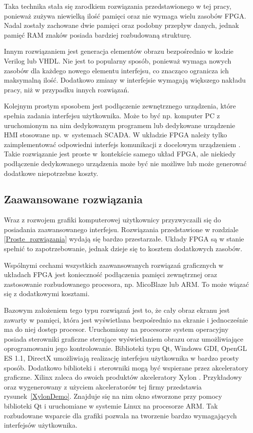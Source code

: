 Taka technika stała się zarodkiem rozwiązania przedstawionego w tej pracy, ponieważ zużywa niewielką ilość pamięci oraz nie wymaga wielu zasobów FPGA. Nadal zostały zachowane dwie pamięci oraz podobny przepływ danych, jednak pamięć RAM znaków posiada bardziej rozbudowaną strukturę.


Innym rozwiązaniem jest generacja elementów obrazu bezpośrednio w kodzie Verilog lub VHDL. Nie jest to popularny sposób, ponieważ wymaga nowych zasobów dla każdego nowego elementu interfejsu, co znacząco ogranicza ich maksymalną ilość. Dodatkowo zmiany w interfejsie wymagają większego nakładu pracy, niż w przypadku innych rozwiązań. \cite{RapidFPGA}


Kolejnym prostym sposobem jest podłączenie zewnętrznego urządzenia, które spełnia zadania interfejsu użytkownika. Może to być np. komputer PC z uruchomionym na nim dedykowanym programem lub dedykowane urządzenie HMI stosowane np. w~systemach SCADA. W układzie FPGA należy tylko zaimplementować odpowiedni interfejs komunikacji z docelowym urządzeniem \cite{HMI_with_FPGA}. Takie rozwiązanie jest proste w~kontekście samego układ FPGA, ale niekiedy podłączenie dedykowanego urządzenia może być nie możliwe lub może generować dodatkowe niepotrzebne koszty.


\subsection{Zaawansowane rozwiązania}


Wraz z rozwojem grafiki komputerowej użytkownicy przyzwyczaili się do posiadania zaawansowanego interfejsu. Rozwiązania przedstawione w rozdziale \ref{Proste_rozwiązania} wydają się bardzo przestarzałe. Układy FPGA są w stanie spełnić to zapotrzebowanie, jednak dzieje się to kosztem dodatkowych zasobów.


Wspólnymi cechami wszystkich zaawansowanych rozwiązań graficznych w układach FPGA jest konieczność podłączenia pamięci zewnętrznej oraz zastosowanie rozbudowanego procesora, np. MicoBlaze lub ARM. To może wiązać się z dodatkowymi kosztami.


Bazowym założeniem tego typu rozwiązań jest to, że cały obraz ekranu jest zawarty w pamięci, która jest wyświetlana bezpośrednio na ekranie i jednocześnie ma do niej dostęp procesor. Uruchomiony na procesorze system operacyjny posiada sterowniki graficzne sterujące wyświetlaniem obrazu oraz umożliwiające oprogramowaniu jego kontrolowanie. Biblioteki typu Qt, Windows GDI, OpenGL ES 1.1, DirectX umożliwiają realizację interfejsu użytkownika w bardzo prosty sposób. Dodatkowo biblioteki i~sterowniki mogą być wspierane przez akceleratory graficzne. Xilinx zaleca do swoich produktów akceleratory Xylon \cite{xilinxHmi}. Przykładowy oraz wygenerowany z użyciem akceleratorów tej firmy przedstawia rysunek~\ref{XylonDemo}. Znajduje się na nim okno stworzone przy pomocy biblioteki Qt i uruchomiane w systemie Linux na procesorze ARM. Tak rozbudowane wsparcie dla grafiki pozwala na tworzenie bardzo wymagających interfejsów użytkownika.


